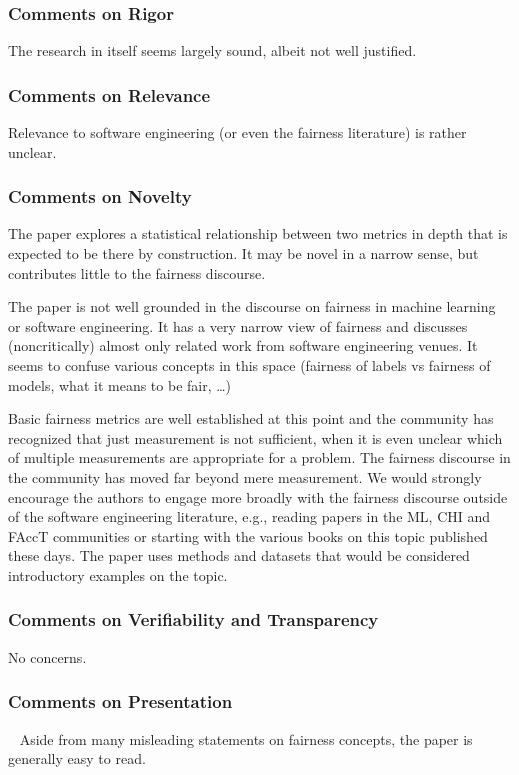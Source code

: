 \documentclass[conference,review,anonymous]{IEEEtran}
\begin{document}
\subsubsection{Comments on Rigor}
The research in itself seems largely sound, albeit not well justified.

\subsubsection{Comments on Relevance}
Relevance to software engineering (or even the fairness literature) is
rather unclear.

\subsubsection{Comments on Novelty}
The paper explores a statistical relationship between two metrics in
depth that is expected to be there by construction. It may be novel in
a narrow sense, but contributes little to the fairness discourse.

The paper is not well grounded in the discourse on fairness in machine
learning or software engineering. It has a very narrow view of
fairness and discusses (noncritically) almost only related work from
software engineering venues. It seems to confuse various concepts in
this space (fairness of labels vs fairness of models, what it means to
be fair, …)

Basic fairness metrics are well established at this point and the
community has recognized that just measurement is not sufficient, when
it is even unclear which of multiple measurements are appropriate for
a problem. The fairness discourse in the community has moved far
beyond mere measurement. We would strongly encourage the authors to
engage more broadly with the fairness discourse outside of the
software engineering literature, e.g., reading papers in the ML, CHI
and FAccT communities or starting with the various books on this topic
published these days. The paper uses methods and datasets that would
be considered introductory examples on the topic.

\subsubsection{Comments on Verifiability and Transparency}
No concerns.

\subsubsection{Comments on Presentation}~\label{sec:509a-presentation}
Aside from many misleading statements on fairness concepts, the paper
is generally easy to read.
\end{document}
